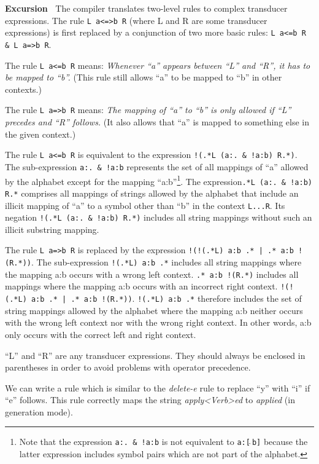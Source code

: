\documentclass[11pt]{article}
\newenvironment{excursion}{

  \hrulefill\nopagebreak

  \textbf{Excursion~}}
{

  \nopagebreak\hrulefill\vspace{0.2cm}

}
\begin{document}
\begin{excursion}
  The compiler translates two-level rules to complex transducer
  expressions. The rule \verb#L a<=>b R# (where L and R are some
  transducer expressions) is first replaced by a conjunction of two
  more basic rules: \verb#L a<=b R & L a=>b R#.
  
  The rule \verb#L a<=b R# means: \emph{Whenever ``a'' appears between
    ``L'' and ``R'', it has to be mapped to ``b''.} (This rule still
  allows ``a'' to be mapped to ``b'' in other contexts.)
  
  The rule \verb#L a=>b R# means: \emph{The mapping of ``a'' to ``b''
    is only allowed if ``L'' precedes and ``R'' follows.} (It also
  allows that ``a'' is mapped to something else in the given context.)
  
  The rule \verb#L a<=b R# is equivalent to the expression  
  \verb#!(.*L (a:. & !a:b) R.*)#. The sub-expression \verb#a:. & !a:b#
  represents the set of all mappings of ``a'' allowed by the alphabet
  except for the mapping ``a:b''\footnote{Note that the expression
    \texttt{a:.  \& !a:b} is not equivalent to \texttt{a:[$\hat{~}$b]}
    because the latter expression includes symbol pairs which are not
    part of the alphabet.}.
  The expression\verb#.*L (a:. & !a:b) R.*# comprises all mappings of
  strings allowed by the alphabet that include an illicit mapping of
  ``a'' to a symbol other than ``b'' in the context \verb#L...R#. Its
  negation  \verb#!(.*L (a:. & !a:b) R.*)# includes all string
  mappings without such an illicit substring mapping.
  
  The rule \verb#L a=>b R# is replaced by the expression
  \verb#!(!(.*L) a:b .* | .* a:b !(R.*))#. The sub-expression
  \verb#!(.*L) a:b .*# includes all string mappings where the mapping
  a:b occurs with a wrong left context. \verb#.* a:b !(R.*)# includes
  all mappings where the mapping a:b occurs with an incorrect right
  context.  \verb#!(!(.*L) a:b .* | .* a:b !(R.*))#.
  \verb#!(.*L) a:b .*# therefore includes the set of string mappings
  allowed by the alphabet where the mapping a:b neither occurs with
  the wrong left context nor with the wrong right context. In other
  words, a:b only occurs with the correct left and right context.
  
  
  ``L'' and ``R'' are any transducer expressions. They should always
  be enclosed in parentheses in order to avoid problems with operator
  precedence.
\end{excursion}

We can write a rule which is similar to the \emph{delete-e} rule to
replace ``y'' with ``i'' if ``e'' follows. This rule correctly maps
the string \emph{apply<Verb>ed} to \emph{applied} (in generation mode).
\end{document}
